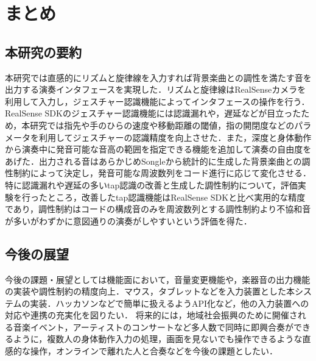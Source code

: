 \chapter{まとめ}
\section{本研究の要約}
本研究では直感的にリズムと旋律線を入力すれば背景楽曲との調性を満たす音を出力する演奏インタフェースを実現した．リズムと旋律線はRealSenseカメラを利用して入力し，ジェスチャー認識機能によってインタフェースの操作を行う．RealSense SDKのジェスチャー認識機能には認識漏れや，遅延などが目立ったため，本研究では指先や手のひらの速度や移動距離の閾値，指の開閉度などのパラメータを利用してジェスチャーの認識精度を向上させた．また，深度と身体動作から演奏中に発音可能な音高の範囲を指定できる機能を追加して演奏の自由度をあげた．出力される音はあらかじめSongleから統計的に生成した背景楽曲との調性制約によって決定し，発音可能な周波数列をコード進行に応じて変化させる．特に認識漏れや遅延の多いtap認識の改善と生成した調性制約について，評価実験を行ったところ，改善したtap認識機能はRealSense SDKと比べ実用的な精度であり，調性制約はコードの構成音のみを周波数列とする調性制約より不協和音が多いがわずかに意図通りの演奏がしやすいという評価を得た．
\section{今後の展望}
今後の課題・展望としては機能面において，音量変更機能や，楽器音の出力機能の実装や調性制約の精度向上．マウス，タブレットなどを入力装置とした本システムの実装．ハッカソンなどで簡単に扱えるようAPI化など，他の入力装置への対応や連携の充実化を図りたい．
将来的には，地域社会振興のために開催される音楽イベント，アーティストのコンサートなど多人数で同時に即興合奏ができるように，複数人の身体動作入力の処理，画面を見ないでも操作できるような直感的な操作，オンラインで離れた人と合奏などを今後の課題としたい．